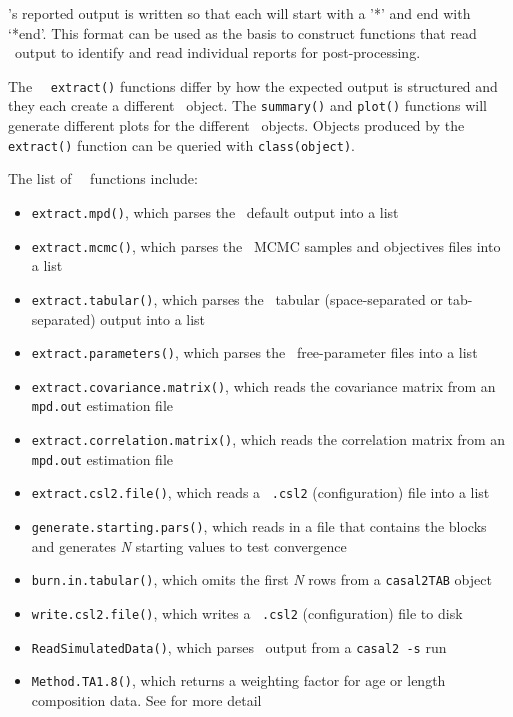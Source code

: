 \CNAME's reported output is written so that each  will start with a '*' and end with `*end'. This format can be used as the basis to construct functions that read \CNAME\ output to identify and read individual reports for post-processing.

The \CNAME\ \R\ \texttt{extract()} functions differ by how the expected output is structured and they each create a different \cname\ object. The \texttt{summary()} and \texttt{plot()} functions will generate different plots for the different \cname\ objects. Objects produced by the \texttt{extract()} function can be queried with \texttt{class(object)}.

The list of \cname\ \R\ functions include:

\begin{itemize}
	\item \texttt{extract.mpd()}, which parses the \CNAME\ default output into a list
	\item \texttt{extract.mcmc()}, which parses the \CNAME\ MCMC samples and objectives files into a list
	\item \texttt{extract.tabular()}, which parses the \CNAME\ tabular (space-separated or tab-separated) output into a list
	\item \texttt{extract.parameters()}, which parses the \CNAME\ free-parameter files into a list
	\item \texttt{extract.covariance.matrix()}, which reads the covariance matrix from an \texttt{mpd.out} estimation file
	\item \texttt{extract.correlation.matrix()}, which reads the correlation matrix from an \texttt{mpd.out} estimation file
	\item \texttt{extract.csl2.file()}, which reads a \CNAME\ \texttt{.csl2} (configuration) file into a list
	\item \texttt{generate.starting.pars()}, which reads in a file that contains the  blocks and generates \emph{N} starting values to test convergence
	\item \texttt{burn.in.tabular()}, which omits the first \emph{N} rows from a \texttt{casal2TAB} object
	\item \texttt{write.csl2.file()}, which writes a \CNAME\ \texttt{.csl2} (configuration) file to disk
	\item \texttt{ReadSimulatedData()}, which parses \CNAME\ output from a \texttt{casal2 -s} run
	\item \texttt{Method.TA1.8()}, which returns a weighting factor for age or length composition data. See \cite{francis2011data} for more detail
\end{itemize}

